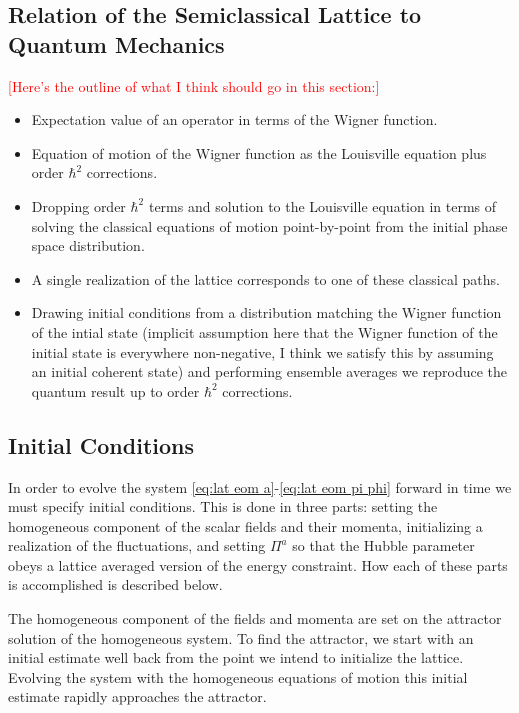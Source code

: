 \subsection{Relation of the Semiclassical Lattice to Quantum Mechanics}
\textcolor{red}{[Here's the outline of what I think should go in this section:]}
\begin{itemize}
  \color{red}
  \item Expectation value of an operator in terms of the Wigner function.
  \item Equation of motion of the Wigner function as the Louisville equation plus order $\hbar^2$ corrections.
  \item Dropping order $\hbar^2$ terms and solution to the Louisville equation in terms of solving the classical equations of motion point-by-point from the initial phase space distribution.
  \item A single realization of the lattice corresponds to one of these classical paths.
  \item Drawing initial conditions from a distribution matching the Wigner function of the intial state (implicit assumption here that the Wigner function of the initial state is everywhere non-negative, I think we satisfy this by assuming an initial coherent state) and performing ensemble averages we reproduce the quantum result up to order $\hbar^2$ corrections.
\end{itemize}
  
\subsection{Initial Conditions} \label{sec:ICs}
In order to evolve the system \eqref{eq:lat eom a}-\eqref{eq:lat eom pi phi} forward in time we must specify initial conditions. This is done in three parts: setting the homogeneous component of the scalar fields and their momenta, initializing a realization of the fluctuations, and setting $\Pi^a$ so that the Hubble parameter obeys a lattice averaged version of the energy constraint. How each of these parts is accomplished is described below.

The homogeneous component of the fields and momenta are set on the attractor solution of the homogeneous system. To find the attractor, we start with an initial estimate well back from the point we intend to initialize the lattice. Evolving the system with the homogeneous equations of motion this initial estimate rapidly approaches the attractor. 

